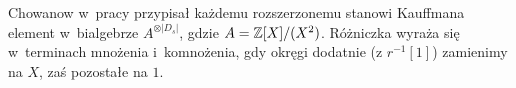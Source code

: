 Chowanow w~pracy \cite{khovanov00} przypisał każdemu rozszerzonemu stanowi Kauffmana
element w~bialgebrze $A^{\otimes |D_s|}$, gdzie $A = \mathbb Z[X]/(X^2)$.
Różniczka wyraża się w~terminach mnożenia i~komnożenia,
gdy okręgi dodatnie (z $r^{-1}[1]$) zamienimy na $X$, zaś pozostałe na $1$.


